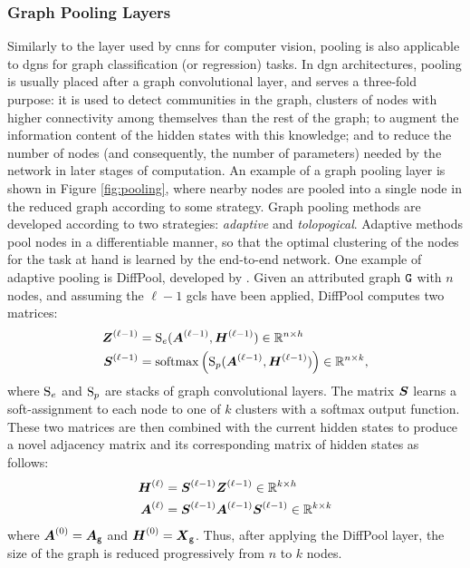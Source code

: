 \subsubsection*{Graph Pooling Layers}\label{sec:pooling}
Similarly to the layer used by \glspl{cnn} for computer vision, pooling is also applicable to \glspl{dgn} for graph classification (or regression) tasks. In \gls{dgn} architectures, pooling is usually placed after a graph convolutional layer, and serves a three-fold purpose: it is used to detect communities in the graph, \ie clusters of nodes with higher connectivity among themselves than the rest of the graph; to augment the information content of the hidden states with this knowledge; and to reduce the number of nodes (and consequently, the number of parameters) needed by the network in later stages of computation. An example of a graph pooling layer is shown in Figure \ref{fig:pooling}, where nearby nodes are pooled into a single node in the reduced graph according to some strategy. Graph pooling methods are developed according to two strategies: \emph{adaptive} and \emph{tolopogical}. Adaptive methods pool nodes in a differentiable manner, so that the optimal clustering of the nodes for the task at hand is learned by the end-to-end network. One example of adaptive pooling is DiffPool, developed by \citet{ying2018diffpool}. Given an attributed graph $\mathtt{G}$ with $n$ nodes, and assuming the $\ell-1$ \glspl{gcl} have been applied, DiffPool computes two matrices:
\begin{align*}
    \GenGraphLayerMat{z}{\ell-1} &= \Fun{S}_e(\LayerAdjMat{\ell-1},\LayerStateMat{\ell-1}) \in \Real^{n \times h}\\
    \GenGraphLayerMat{s}{\ell-1} &= \softmax\Par{\Fun{S}_p(\LayerAdjMat{\ell-1},\LayerStateMat{\ell-1})} \in \Real^{n \times k},
\end{align*}
where $\mathrm{S}_e$ and $\mathrm{S}_p$ are stacks of graph convolutional layers. The matrix $\Matrix{S}$ learns a soft-assignment to each node to one of $k$ clusters with a softmax output function. These two matrices are then combined with the current hidden states to produce a novel adjacency matrix and its corresponding matrix of hidden states as follows:
\begin{align*}
    \LayerStateMat{\ell} &= \GenGraphLayerMat{s}{\ell-1}\GenGraphLayerMat{z}{\ell-1} \in \Real^{k \times h}\\
    \LayerAdjMat{\ell} &= \GenGraphLayerMat{s}{\ell-1}\LayerAdjMat{\ell-1}\GenGraphLayerMat{s}{\ell-1} \in \Real^{k \times k}
\end{align*}
where $\LayerAdjMat{0} = \AdjMatrix{g}$ and $\LayerStateMat{0} = \FeatureMatrix{g}$. Thus, after applying the DiffPool layer, the size of the graph is reduced progressively from $n$ to $k$ nodes.

